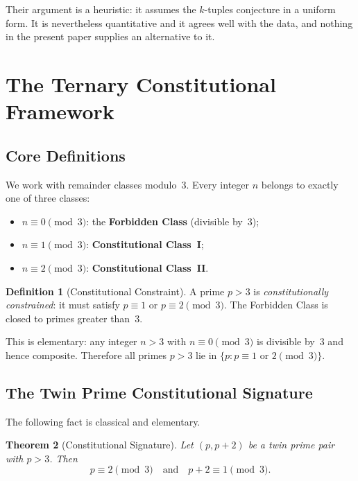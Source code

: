 \documentclass[12pt,a4paper]{article}
\theoremstyle{plain}
\newtheorem{theorem}{Theorem}[section]
\theoremstyle{definition}
\newtheorem{definition}[theorem]{Definition}
\theoremstyle{remark}
\begin{document}
Their argument is a heuristic: it assumes the $k$-tuples conjecture in a uniform form.
It is nevertheless quantitative and it agrees well with the data, and nothing in the
present paper supplies an alternative to it.

\section{The Ternary Constitutional Framework}
\label{sec:framework}

\subsection{Core Definitions}

We work with remainder classes modulo~3. Every integer $n$ belongs to exactly one of
three classes:
\begin{itemize}
  \item $n \equiv 0 \pmod{3}$: the \textbf{Forbidden Class} (divisible by~3);
  \item $n \equiv 1 \pmod{3}$: \textbf{Constitutional Class~I};
  \item $n \equiv 2 \pmod{3}$: \textbf{Constitutional Class~II}.
\end{itemize}

\begin{definition}[Constitutional Constraint]
\label{def:constraint}
A prime $p > 3$ is \emph{constitutionally constrained}: it must satisfy
$p \equiv 1$ or $p \equiv 2 \pmod{3}$. The Forbidden Class is closed to primes
greater than~3.
\end{definition}

This is elementary: any integer $n > 3$ with $n \equiv 0 \pmod{3}$ is divisible by~3
and hence composite. Therefore all primes $p > 3$ lie in
$\{p : p \equiv 1 \text{ or } 2 \pmod{3}\}$.

\subsection{The Twin Prime Constitutional Signature}

The following fact is classical and elementary.

\begin{theorem}[Constitutional Signature]
\label{thm:signature}
Let $(p, p+2)$ be a twin prime pair with $p > 3$. Then
\[
  p \equiv 2 \pmod{3} \quad \text{and} \quad p + 2 \equiv 1 \pmod{3}.
\]
\end{theorem}
\end{document}
